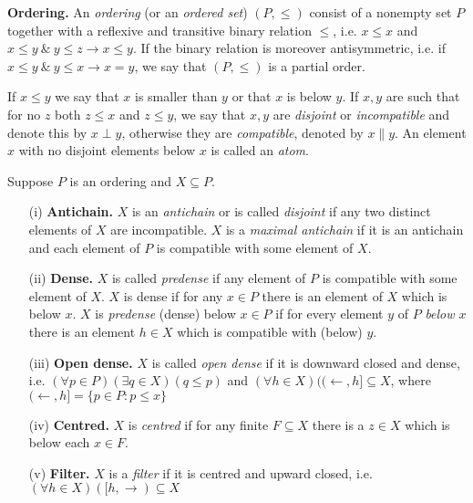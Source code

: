 \begin{definition}\label{ordering}
{\bf Ordering.}
            An \emph{ordering} (or an \emph{ordered set}) $(P,\leq)$
	    consist of a nonempty set $P$ together with a reflexive and transitive
	    binary relation $\leq$, i.e. $x\leq x$ and $x\leq y\ \&\ y\leq z\rightarrow x\leq y$.
	    If the binary relation is moreover antisymmetric,
            i.e. if $x\leq y\ \&\ y\leq x\rightarrow x=y$, we say that $(P,\leq)$ is a partial order.

            If $x\leq y$ we say that $x$ is smaller than $y$ or that $x$ is below $y$. If $x,y$ are such that for no $z$ both $z\leq x$ and $z\leq y$,
            we say that $x,y$ are \emph{disjoint} or \emph{incompatible} and denote this by $x\perp y$, otherwise they are \emph{compatible}, denoted by $x\parallel y$.
            An element $x$ with no disjoint elements below $x$ is called an \emph{atom}.
\end{definition}

\begin{definition}\label{various} Suppose $P$ is an ordering and $X\subseteq P$.
\begin{itemize}
 \item[(i)] {\bf Antichain.} $X$ is an \emph{antichain} or is called \emph{disjoint} if any
	two distinct elements of $X$ are incompatible. $X$ is a
	\emph{maximal antichain} if it is an antichain and each element of
	$P$ is compatible with some element of $X$.
 \item[(ii)] {\bf Dense.} $X$ is called \emph{predense} if any element of $P$
	is compatible with some element of $X$. $X$ is dense if for any $x\in P$
	there is an element of $X$ which is below $x$.
	$X$ is \emph{predense} (dense) below $x\in P$ if for every element $y$
	of $P$ \emph{below $x$} there is an element $h\in X$ which is
	compatible with (below) $y$.
 \item[(iii)]{\bf Open dense.} $X$ is called \emph{open dense} if it is downward closed and dense,
	i.e. $(\forall p\in P)(\exists q\in X)(q\leq p)$ and $(\forall h\in X)((\leftarrow,h]\subseteq X$, where
	$(\leftarrow,h]=\{p\in P:p\leq x\}$
 \item[(iv)]{\bf Centred.} $X$ is \emph{centred} if for any finite $F\subseteq X$
	there is a $z\in X$ which is below each $x\in F$.
 \item[(v)]{\bf Filter.} $X$ is a \emph{filter} if it is centred and upward closed,
	i.e. $(\forall h\in X)([h,\rightarrow)\subseteq X$
\end{itemize}
\end{definition}

